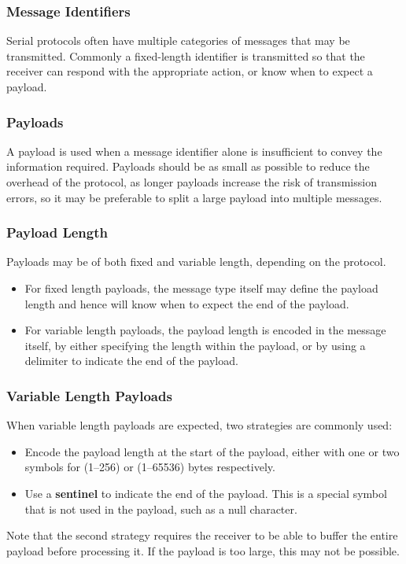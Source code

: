 \documentclass{article}
\begin{document}
\subsubsection{Message Identifiers}
Serial protocols often have multiple categories of messages that may be
transmitted. Commonly a fixed-length identifier is transmitted so that
the receiver can respond with the appropriate action, or know when to
expect a payload.
\subsubsection{Payloads}
A payload is used when a message identifier alone is insufficient to
convey the information required. Payloads should be as small as
possible to reduce the overhead of the protocol, as longer payloads
increase the risk of transmission errors, so it may be preferable to
split a large payload into multiple messages.
\subsubsection{Payload Length}
Payloads may be of both fixed and variable length, depending on the
protocol.
\begin{itemize}
    \item For fixed length payloads, the message type itself may define
          the payload length and hence will know when to expect the end
          of the payload.
    \item For variable length payloads, the payload length is encoded
          in the message itself, by either specifying the length within
          the payload, or by using a delimiter to indicate the end of
          the payload.
\end{itemize}
\subsubsection{Variable Length Payloads}
When variable length payloads are expected, two strategies are commonly
used:
\begin{itemize}
    \item Encode the payload length at the start of the payload, either
          with one or two symbols for (1--256) or (1--65536) bytes
          respectively.
    \item Use a \textbf{sentinel} to indicate the end of the payload.
          This is a special symbol that is not used in the payload,
          such as a null character.
\end{itemize}
Note that the second strategy requires the receiver to be able to buffer the entire payload before processing it.
If the payload is too large, this may not be possible.
\end{document}
